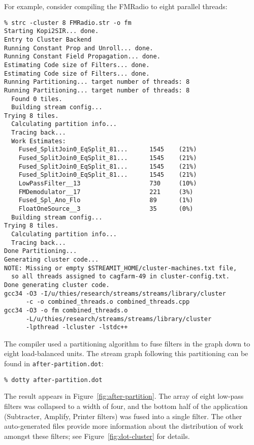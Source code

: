 For example, consider compiling the FMRadio to eight parallel threads:
{\small
\begin{verbatim}
% strc -cluster 8 FMRadio.str -o fm
Starting Kopi2SIR... done.
Entry to Cluster Backend
Running Constant Prop and Unroll... done.
Running Constant Field Propagation... done.
Estimating Code size of Filters... done.
Estimating Code size of Filters... done.
Running Partitioning... target number of threads: 8
Running Partitioning... target number of threads: 8
  Found 0 tiles.
  Building stream config...
Trying 8 tiles.
  Calculating partition info...
  Tracing back...
  Work Estimates:
    Fused_SplitJoin0_EqSplit_81...      1545    (21%)
    Fused_SplitJoin0_EqSplit_81...      1545    (21%)
    Fused_SplitJoin0_EqSplit_81...      1545    (21%)
    Fused_SplitJoin0_EqSplit_81...      1545    (21%)
    LowPassFilter__13                   730     (10%)
    FMDemodulator__17                   221     (3%)
    Fused_Spl_Ano_Flo                   89      (1%)
    FloatOneSource__3                   35      (0%)
  Building stream config...
Trying 8 tiles.
  Calculating partition info...
  Tracing back...
Done Partitioning...
Generating cluster code...
NOTE: Missing or empty $STREAMIT_HOME/cluster-machines.txt file,
  so all threads assigned to cagfarm-49 in cluster-config.txt.
Done generating cluster code.
gcc34 -O3 -I/u/thies/research/streams/streams/library/cluster 
      -c -o combined_threads.o combined_threads.cpp
gcc34 -O3 -o fm combined_threads.o 
      -L/u/thies/research/streams/streams/library/cluster 
      -lpthread -lcluster -lstdc++
\end{verbatim}}

The compiler used a partitioning algorithm to fuse filters in the
graph down to eight load-balanced units.  The stream graph following this
partitioning can be found in {\tt after-partition.dot}:
{\small
\begin{verbatim}
% dotty after-partition.dot
\end{verbatim}}
The result appears in Figure~\ref{fig:after-partition}.  The array of
eight low-pass filters was collapsed to a width of four, and the
bottom half of the application (Subtracter, Amplify, Printer filters)
was fused into a single filter.  The other auto-generated files
provide more information about the distribution of work amongst these
filters; see Figure~\ref{fig:dot-cluster} for details.

